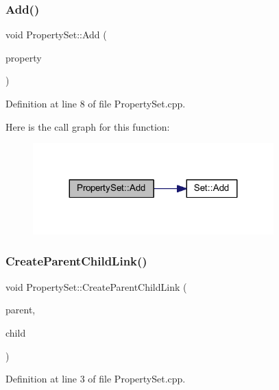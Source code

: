 \subsubsection{\texorpdfstring{Add()}{Add()}}
{\footnotesize\ttfamily void Property\+Set\+::\+Add (\begin{DoxyParamCaption}\item[{wx\+P\+G\+Property $\ast$}]{property }\end{DoxyParamCaption})}



Definition at line 8 of file Property\+Set.\+cpp.

Here is the call graph for this function\+:\nopagebreak
\begin{figure}[H]
\begin{center}
\leavevmode
\includegraphics[width=263pt]{class_property_set_ae3ee2ada7aa02653e9f4da3e34640a1e_cgraph}
\end{center}
\end{figure}
\mbox{\label{class_property_set_a26e9efb314e2ed720719e13c459f137b}} 
\subsubsection{\texorpdfstring{Create\+Parent\+Child\+Link()}{CreateParentChildLink()}}
{\footnotesize\ttfamily void Property\+Set\+::\+Create\+Parent\+Child\+Link (\begin{DoxyParamCaption}\item[{wx\+P\+G\+Property $\ast$}]{parent,  }\item[{wx\+P\+G\+Property $\ast$}]{child }\end{DoxyParamCaption})}



Definition at line 3 of file Property\+Set.\+cpp.

\mbox{\label{class_property_set_a158da716546ca640cd81ffb555bcfddc}} 

